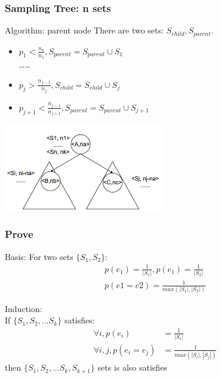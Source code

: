 \documentclass[notheorems, aspectratio=54]{beamer}
\begin{document}
\begin{frame}
    \frametitle{Sampling Tree: n sets}
    \begin{block} {Algorithm: parent node}
        There are two sets: $S_{child}, S_{parent}$.
        \begin{itemize}
            \item $p_1 < \frac{n_a}{n_1}, S_{parent} = S_{parent}\cup S_1$\\
            \dots\dots
            \item $p_j > \frac{n_{j-1}}{n_j}, S_{child} = S_{child}\cup S_j$
            \item $p_{j+1} < \frac{n_{j-1}}{n_{j+1}}, S_{parent} = S_{parent}\cup S_{j+1}$
        \end{itemize}
    \end{block}
    \centering
    \includegraphics[width=7cm]{global_img_dir/SamplingTreek.png}
\end{frame}

\begin{frame}
    \frametitle{Prove}
        Basis: For two sets $\{S_1, S_2\}$: 
        \begin{equation}
            \begin{aligned}
                p(e_1) = \frac{1}{|S_1|}, p(e_1) = \frac{1}{|S_2|}\\
                p(e1=e2) = \frac{1}{max(|S_1|,|S_2|)}
            \end{aligned}
        \end{equation}
        
        Induction: \\
        If $\{S_1, S_2, ... S_k\}$ satisfies: 
        \begin{equation}
            \begin{aligned}
                \forall i, p(e_i) &= \frac{1}{|S_i|}\\
                \forall i,j , p(e_i=e_j) &= \frac{1}{max(|S_i|,|S_j|)}
            \end{aligned}
        \end{equation}
        then $\{S_1, S_2, ... S_k, S_{k+1}\}$ sets is also satisfies

\end{frame}
\end{document}
